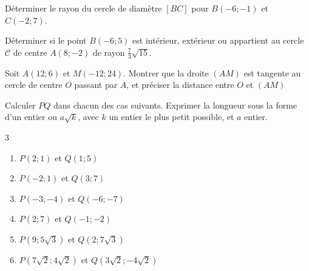 \begin{exercise}\label{chapter06:exercice:distances:cercle01} Déterminer le rayon du cercle de diamètre $[BC]$ pour $B(-6;-1)$ et $C(-2;7)$.
\end{exercise}
\begin{exercise}\label{chapter06:exercice:distances:cercle02}  
	Déterminer si le point $B(-6;5)$ est intérieur, extérieur ou appartient au cercle $\mathscr{C}$ de centre $A(8;-2)$ de rayon $\tfrac{7}{3}\sqrt{15}$.
\end{exercise}
\begin{exercise}  
	Soit $A(12;6)$ et $M(-12;24)$.  
	Montrer que la droite $(AM)$ est tangente au cercle de centre $O$ passant par $A$, et préciser la distance entre $O$ et $(AM)$
\end{exercise} 
\begin{exercise} \label{chapter06:exercice:distances:entrainement}  	Calculer $PQ$  dans chacun des cas suivants. Exprimer la longueur sous la forme d'un entier ou $a\sqrt{k}$, avec $k$ un entier le plus petit possible, et $a$ entier.
	\begin{multicols}{3}
		\begin{enumerate}[label=\alph*),leftmargin=* ]
			\item $P(2;1)$ et $Q(1;5)$
			\item $P(-2;1)$ et $Q(3;7)$
			\item $P(-3;-4)$ et $Q(-6;-7)$
			\item $P(2;7)$ et $Q(-1;-2)$ 
			\item $P(9;5\sqrt{3})$ et $Q(2;7\sqrt{3})$ 
			\item $P(7\sqrt{2};4\sqrt{2})$ et $Q(3\sqrt{2};-4\sqrt{2})$ 
		\end{enumerate}
	\end{multicols}
\end{exercise} 
%
\newpage 

